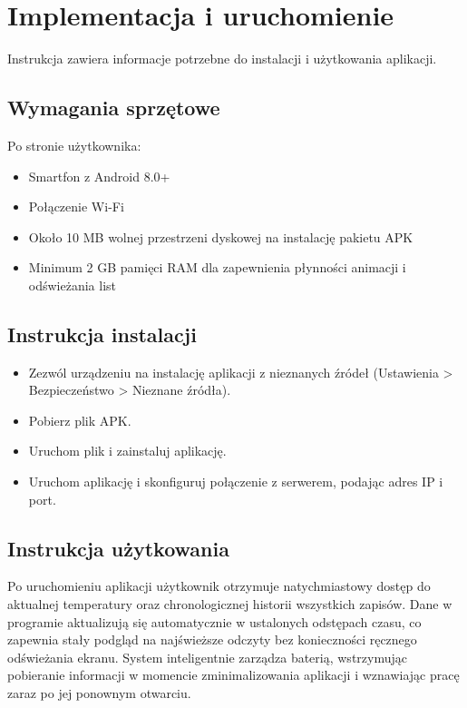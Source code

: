\chapter{Implementacja i uruchomienie}
Instrukcja zawiera informacje potrzebne do instalacji i użytkowania aplikacji.

\section{Wymagania sprzętowe}
Po stronie użytkownika:
\begin{itemize}
	\item Smartfon z Android 8.0+
	\item Połączenie Wi-Fi
	\item Około 10 MB wolnej przestrzeni dyskowej na instalację pakietu APK
	\item Minimum 2 GB pamięci RAM dla zapewnienia płynności animacji i odświeżania list
\end{itemize}

\section{Instrukcja instalacji}
\begin{itemize}
	\item Zezwól urządzeniu na instalację aplikacji z nieznanych źródeł (Ustawienia > Bezpieczeństwo > Nieznane źródła).
	\item Pobierz plik APK.
	\item Uruchom plik i zainstaluj aplikację.
	\item Uruchom aplikację i skonfiguruj połączenie z serwerem, podając adres IP i port.
\end{itemize}

\section{Instrukcja użytkowania}
Po uruchomieniu aplikacji użytkownik otrzymuje natychmiastowy dostęp do aktualnej temperatury oraz chronologicznej historii wszystkich zapisów. Dane w programie aktualizują się automatycznie w ustalonych odstępach czasu, co zapewnia stały podgląd na najświeższe odczyty bez konieczności ręcznego odświeżania ekranu. System inteligentnie zarządza baterią, wstrzymując pobieranie informacji w momencie zminimalizowania aplikacji i wznawiając pracę zaraz po jej ponownym otwarciu.
